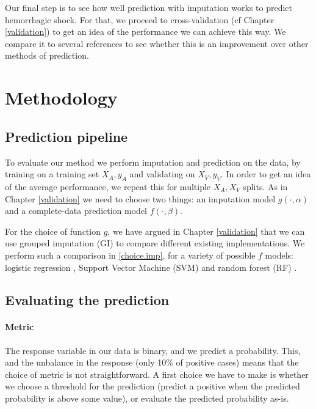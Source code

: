 
Our final step is to see how well prediction with imputation works to predict hemorrhagic shock. For that, we proceed to cross-validation (cf Chapter \ref{validation}) to get an idea of the performance we can achieve this way. We compare it to several references to see whether this is an improvement over other methods of prediction.
	\section{Methodology}
		\subsection{Prediction pipeline}
To evaluate our method we perform imputation and prediction on the data, by training on a training set $X_A, y_A$ and validating on $X_V, y_V$. In order to get an idea of the average performance, we repeat this for multiple $X_A, X_V$ splits. As in Chapter \ref{validation} we need to choose two things: an imputation model $g(\cdot, \alpha)$ and a complete-data prediction model $f(\cdot, \beta)$.

For the choice of function $g$, we have argued in Chapter \ref{validation} that we can use grouped imputation (GI) to compare different existing implementations. We perform such a comparison in \ref{choice.imp}, for a variety of possible $f$ models: logistic regression \cite{hosmer2013logreg}, Support Vector Machine (SVM) \cite{hearst1998SVM} and random forest (RF) \cite{svetnik2003RF}. 

		\subsection{Evaluating the prediction}
\paragraph{Metric}
The response variable in our data is binary, and we predict a probability. This, and the unbalance in the response (only 10\% of positive cases) means that the choice of metric is not straightforward. A first choice we have to make is whether we choose a threshold for the prediction (predict a positive when the predicted probability is above some value), or evaluate the predicted probability as-is.

